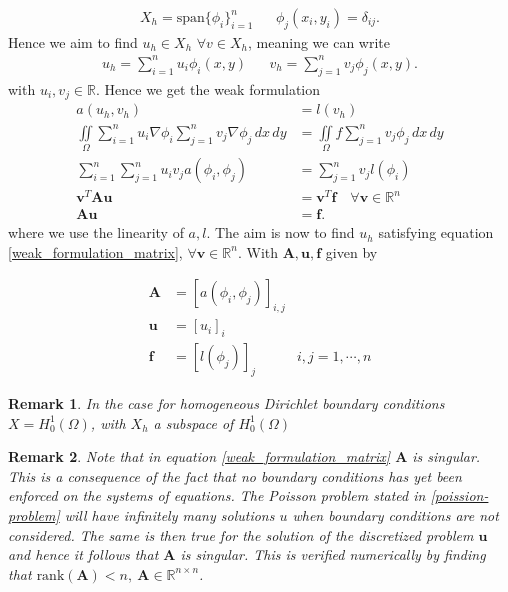 \documentclass[a4paper,english]{elsarticle}%
\newtheorem*{remark}{Remark}
\begin{document}
\begin{equation*}
    \begin{aligned}
X_h = \text{span} \{\phi_i\}_{i=1}^n & & \phi_j(x_i,y_i) = \delta_{ij}.
    \end{aligned}
\end{equation*}
Hence we aim to find $u_h \in X_h$ $\forall v \in X_h$, meaning we can write
\begin{equation*}
    \begin{aligned}
u_h = \sum_{i=1}^n u_i \phi_i(x,y) & & v_h = \sum_{j=1}^n v_j \phi_j(x,y).
    \end{aligned}
\end{equation*}
\noindent with $u_i,v_j \in \mathbb{R}$. Hence we get the weak formulation
\begin{equation}
\begin{aligned}
a(u_h,v_h) &= l(v_h) 
\\
\iint\limits_{\Omega} 
\sum_{i=1}^n u_i \nabla \phi_i \sum_{j=1}^n v_j \nabla\phi_j \, dx \, dy 
&= \iint\limits_{\Omega} f \sum_{j=1}^n v_j \phi_j \, dx \, dy
\\
\sum_{i=1}^n\sum_{j=1}^n u_i v_j a(\phi_i,\phi_j) &= \sum_{j=1}^n v_j l(\phi_i)
\\
\bm v^T\bm A \bm u &= \bm v^T \bm f \quad \forall \bm v \in \mathbb R^n
\\ \bm A \bm u &= \bm f.
\label{weak_formulation_matrix}
\end{aligned}
\end{equation}
where we use the linearity of $a,l$. 
The aim is now to find $u_h$ satisfying equation \eqref{weak_formulation_matrix}, $\forall \bm v \in \mathbb R^n$.
With $\bm A, \bm u, \bm f$ given by

\begin{equation}
    \begin{aligned}
\bm A &= [a(\phi_i,\phi_j)]_{i,j}
\\ 
\bm u &= [u_i]_i
\\
\bm f &= [l(\phi_j)]_j & i,j = 1,\cdots,n
\end{aligned}
\end{equation}
\begin{remark}
    In the case for homogeneous Dirichlet boundary conditions $X = H_0^1(\Omega)$, with $X_h$ a subspace of $H_0^1(\Omega)$ 
\end{remark}
\begin{remark}
Note that in equation \eqref{weak_formulation_matrix} $\bm A$ is singular. 
This is a consequence of the fact that no boundary conditions has yet been enforced on the systems of equations.
The Poisson problem stated in \eqref{poission-problem} will have infinitely many solutions $u$ when boundary conditions are not considered.
The same is then true for the solution of the discretized problem $\bm u$ and hence it follows that $\bm A$ is singular.
This is verified numerically by finding that $\textrm{rank}(\bm A) < n, \ \bm A \in \mathbb{R}^{n \times n}$.
\end{remark}
\end{document}
